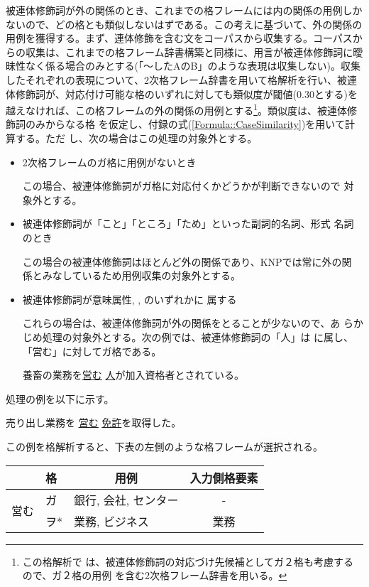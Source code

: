 \documentclass[fleqn]{nlp}
\newcommand{\sm}[1]{}
\begin{document}
被連体修飾詞が外の関係のとき、これまでの格フレームには内の関係の用例しか
ないので、どの格とも類似しないはずである。この考えに基づいて、外の関係の
用例を獲得する。まず、連体修飾を含む文をコーパスから収集する。コーパスか
らの収集は、これまでの格フレーム辞書構築と同様に、用言が被連体修飾詞に曖
昧性なく係る場合のみとする(「〜したAのB」のような表現は収集しない)。収集
したそれぞれの表現について、2次格フレーム辞書を用いて格解析を行い、被連
体修飾詞が、対応付け可能な格のいずれに対しても類似度が閾値(0.30とする)を
越えなければ、この格フレームの外の関係の用例とする\footnote{この格解析で
は、被連体修飾詞の対応づけ先候補としてガ２格も考慮するので、ガ２格の用例
を含む2次格フレーム辞書を用いる。}。類似度は、被連体修飾詞のみからなる格
を仮定し、付録の式(\ref{Formula::CaseSimilarity})を用いて計算する。ただ
し、次の場合はこの処理の対象外とする。
\begin{itemize}
 \item 2次格フレームのガ格に用例がないとき

       この場合、被連体修飾詞がガ格に対応付くかどうかが判断できないので
       対象外とする。

 \item 被連体修飾詞が「こと」「ところ」「ため」といった副詞的名詞、形式
       名詞のとき

       この場合の被連体修飾詞はほとんど外の関係であり、KNPでは常に外の関
       係とみなしているため用例収集の対象外とする。

 \item 被連体修飾詞が意味属性\sm{主体}, \sm{時間}, \sm{数量}のいずれかに
       属する 

       これらの場合は、被連体修飾詞が外の関係をとることが少ないので、あ
       らかじめ処理の対象外とする。次の例では、被連体修飾詞の「人」は
       \sm{主体}に属し、「営む」に対してガ格である。
       \begin{exe}
	\ex 養畜の業務を\underline{\underline{営む}} \underline{人}が加入資格者とされている。
       \end{exe}
\end{itemize}

\vspace*{2ex}

処理の例を以下に示す。

\begin{exe}
 \ex\label{例::用言ごとの外の関係} 売り出し業務を \underline{\underline{営む}} \underline{免許}を取得した。
\end{exe}

\noindent
この例を格解析すると、下表の左側のような格フレームが選択される。
\begin{center}
 \begin{tabular}{l|l|l||c} \hline
                         & 格  & \multicolumn{1}{c||}{用例} & 入力側格要素 \\ \hline
 \multirow{2}{2zw}{営む} & ガ  & 銀行, 会社, センター & - \\
                         & ヲ* & 業務, ビジネス & 業務 \\ \hline
 \end{tabular}
\end{center}
\end{document}
